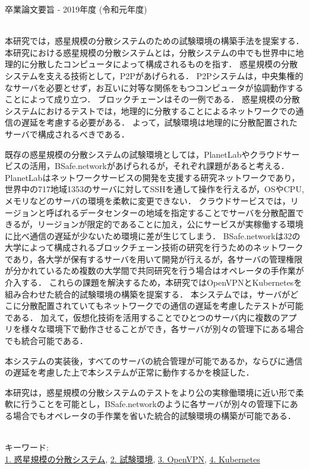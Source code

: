 卒業論文要旨 - 2019年度 (令和元年度)
\begin{center}
\begin{large}
\end{large}
\end{center}

~ \\
本研究では，惑星規模の分散システムのための試験環境の構築手法を提案する．
本研究における惑星規模の分散システムとは，分散システムの中でも世界中に地理的に分散したコンピュータによって構成されるものを指す．
惑星規模の分散システムを支える技術として，P2Pがあげられる．
P2Pシステムは，中央集権的なサーバを必要とせず，お互いに対等な関係をもつコンピュータが協調動作することによって成り立つ．
ブロックチェーンはその一例である．
惑星規模の分散システムにおけるテストでは，地理的に分散することによるネットワークでの通信の遅延を考慮する必要がある．
よって，試験環境は地理的に分散配置されたサーバで構成されるべきである．

既存の惑星規模の分散システムの試験環境としては，PlanetLabやクラウドサービスの活用，BSafe.networkがあげられるが，それぞれ課題があると考える．
PlanetLabはネットワークサービスの開発を支援する研究ネットワークであり，世界中の717地域1353のサーバに対してSSHを通して操作を行えるが，OSやCPU,メモリなどのサーバの環境を柔軟に変更できない．
クラウドサービスでは，リージョンと呼ばれるデータセンターの地域を指定することでサーバを分散配置できるが，リージョンが限定的であることに加え，公にサービスが実稼働する環境に比べ通信の遅延が少ないため環境に差が生じてしまう．
BSafe.networkは32の大学によって構成されるブロックチェーン技術の研究を行うためのネットワークであり，各大学が保有するサーバを用いて開発が行えるが，各サーバの管理権限が分かれているため複数の大学間で共同研究を行う場合はオペレータの手作業が介入する．
これらの課題を解決するため，本研究ではOpenVPNとKubernetesを組み合わせた統合的試験環境の構築を提案する．
本システムでは，サーバがどこに分散配置されていてもネットワークでの通信の遅延を考慮したテストが可能である．
加えて，仮想化技術を活用することでひとつのサーバ内に複数のアプリを様々な環境下で動作させることができ，各サーバが別々の管理下にある場合でも統合可能である．

本システムの実装後，すべてのサーバの統合管理が可能であるか，ならびに通信の遅延を考慮した上で本システムが正常に動作するかを検証した．

本研究は，惑星規模の分散システムのテストをより公の実稼働環境に近い形で柔軟に行うことを可能とし，BSafe.networkのように各サーバが別々の管理下にある場合でもオペレータの手作業を省いた統合的試験環境の構築が可能である．

~ \\
キーワード:\\
\underline{1. 惑星規模の分散システム},
\underline{2. 試験環境},
\underline{3. OpenVPN},
\underline{4. Kubernetes}

\begin{flushright}
\dept \\
\author
\end{flushright}
